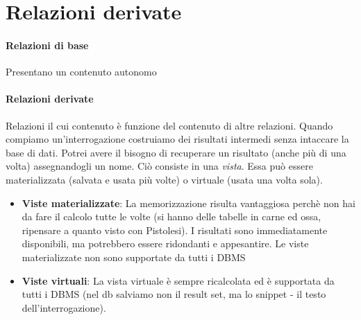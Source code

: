 \section{Relazioni derivate}
\paragraph{Relazioni di base} Presentano un contenuto autonomo
\paragraph{Relazioni derivate} Relazioni il cui contenuto è funzione del contenuto di altre relazioni. Quando compiamo un'interrogazione costruiamo dei risultati intermedi senza intaccare la base di dati. Potrei avere il bisogno di recuperare un risultato (anche più di una volta) assegnandogli un nome. Ciò consiste in una \emph{vista}. Essa può essere materializzata (salvata e usata più volte) o virtuale (usata una volta sola).
\begin{itemize}
	\item \textbf{Viste materializzate}: La memorizzazione risulta vantaggiosa perchè non hai da fare il calcolo tutte le volte (si hanno delle tabelle in carne ed ossa, ripensare a quanto visto con Pistolesi). I risultati sono immediatamente disponibili, ma potrebbero essere ridondanti e appesantire. Le viste materializzate non sono supportate da tutti i DBMS
	\item \textbf{Viste virtuali}: La vista virtuale è sempre ricalcolata ed è supportata da tutti i DBMS (nel db salviamo non il result set, ma lo snippet - il testo dell'interrogazione).
\end{itemize}
